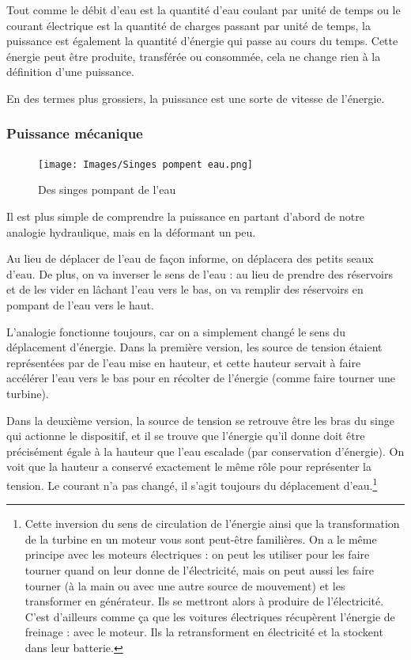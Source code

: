\documentclass{article}
\begin{document}
Tout comme le débit d'eau est la quantité d'eau coulant par unité de temps ou le courant électrique est la quantité de charges passant par unité de temps, la puissance est également la quantité d'énergie qui passe au cours du temps. Cette énergie peut être produite, transférée ou consommée, cela ne change rien à la définition d'une puissance.

En des termes plus grossiers, la puissance est une sorte de vitesse de l'énergie. 

\subsubsection{Puissance mécanique}

\begin{figure}
    \centering
    \texttt{[image: Images/Singes pompent eau.png]}
    \caption{Des singes pompant de l'eau}
\end{figure}

Il est plus simple de comprendre la puissance en partant d'abord de notre analogie hydraulique, mais en la déformant un peu.

Au lieu de déplacer de l'eau de façon informe, on déplacera des petits seaux d'eau. De plus, on va inverser le sens de l'eau : au lieu de prendre des réservoirs et de les vider en lâchant l'eau vers le bas, on va remplir des réservoirs en pompant de l'eau vers le haut.

L'analogie fonctionne toujours, car on a simplement changé le sens du déplacement d'énergie. Dans la première version, les source de tension étaient représentées par de l'eau mise en hauteur, et cette hauteur servait à faire accélérer l'eau vers le bas pour en récolter de l'énergie (comme faire tourner une turbine).

Dans la deuxième version, la source de tension se retrouve être les bras du singe qui actionne le dispositif, et il se trouve que l'énergie qu'il donne doit être précisément égale à la hauteur que l'eau escalade (par conservation d'énergie). On voit que la hauteur a conservé exactement le même rôle pour représenter la tension. Le courant n'a pas changé, il s'agit toujours du déplacement d'eau.\footnote{Cette inversion du sens de circulation de l'énergie ainsi que la transformation de la turbine en un moteur vous sont peut-être familières. On a le même principe avec les moteurs électriques : on peut les utiliser pour les faire tourner quand on leur donne de l'électricité, mais on peut aussi les faire tourner (à la main ou avec une autre source de mouvement) et les transformer en générateur. Ils se mettront alors à produire de l'électricité. C'est d'ailleurs comme ça que les voitures électriques récupèrent l'énergie de freinage : avec le moteur. Ils la retransforment en électricité et la stockent dans leur batterie.}
\end{document}

